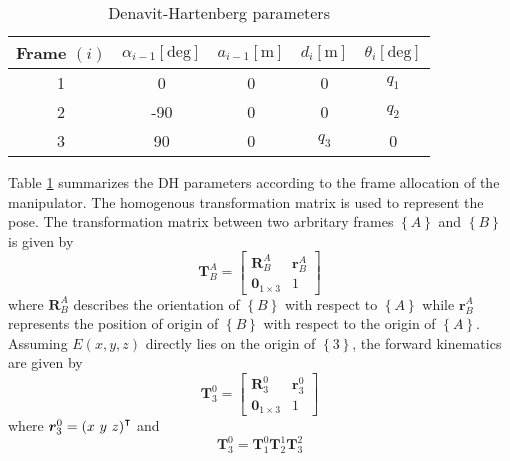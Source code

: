 \begin{table}[h!]
	\centering
	\begin{tabular}{|c|c|c|c|c|}
		\hline
		\textbf{Frame $\left(i\right)$} &  $\alpha_{i-1} \left[\text{deg}\right]$ & $a_{i-1} \left[\text{m}\right]$ & $d_i \left[\text{m}\right]$ & $\theta_i \left[\text{deg}\right]$ \\ \hline
		1                                  & 0     & 0                    & 0                 &       $q_1$                              \\ \hline
		2                                 & -90     & 0                     & 0                 &       $q_2$                              \\ \hline
		3                                 & 90       & 0                   & $q_3$                    & 0                                   \\ \hline
	\end{tabular}
	\caption{Denavit-Hartenberg parameters}
	\label{tab:dh}
\end{table}
Table \ref{tab:dh} summarizes the DH parameters according to the frame allocation of the manipulator. The homogenous transformation matrix is used to represent the pose. The transformation matrix between two arbritary frames $\left\{A\right\}$ and $\left\{B\right\}$ is given by
\begin{equation*}
	\bm{T}_{B}^{A} = \left[\begin{array}{c|c}
		\bm{R}_{B}^{A} & \bm{r}_{B}^{A}\\
		\hline
		\bm{0}_{1\times3} & 1
	\end{array}\right]
\end{equation*}
where $\bm{R}_{B}^{A}$ describes the orientation of $\left\{B\right\}$ with respect to $\left\{A\right\}$ while $\bm{r}_{B}^{A}$ represents the position of origin of $\left\{B\right\}$ with respect to the origin of $\left\{A\right\}$. Assuming $E\left(x,y,z\right)$ directly lies on the origin of $\left\{3\right\}$, the forward kinematics are given by
\begin{equation*}
	\bm{T}_{3}^{0} = \left[\begin{array}{c|c}
		\bm{R}_{3}^{0} & \bm{r}_{3}^{0}\\
		\hline
		\bm{0}_{1\times3} & 1
	\end{array}\right]
\end{equation*}
where $\bm{r}_{3}^{0} = \left(x \text{ } y \text{ } z\right)^\intercal$ and 
\begin{equation*}
	\bm{T}_{3}^{0} = \bm{T}_{1}^{0}\bm{T}_{2}^{1}\bm{T}_{3}^{2}
\end{equation*}
